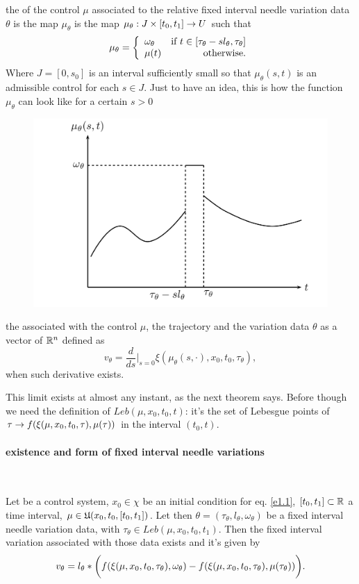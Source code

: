 {	\item the  of the control $\mu$ associated to the relative fixed interval needle variation data $\theta$ is the map $\mu_\theta$ is the map $\mu_\theta:J\times[t_0,t_1]\rightarrow U$ such that
	\[\mu_\theta = \left\{ \begin{array}{lr}
	\omega_\theta & \mbox{if $t\in[\tau_\theta-sl_\theta,\tau_\theta]$}\\
	\mu(t) & \mbox{otherwise}.\end{array}
	\right.	\]
	Where $J=[0,s_0]$ is an interval sufficiently small so that $\mu_\theta(s,t)$ is an admissible control for each $s\in J$.
	Just to have an idea, this is how the function $\mu_\theta$ can look like for a certain $s>0$
	\begin{figure}[H]
		\includegraphics[width=\linewidth]{imgs/needle-variation.png}
		\caption{}
		\label{fig-needle-variation}
	\end{figure}
	\item the  associated with the control $\mu$, the trajectory \trajWinCond{\cdot} and the variation data $\theta$ as a vector of $\mathbb{R}^n$ defined as 
	\[v_\theta = \frac{d}{ds}\bigg|_{s=0} \xi(\mu_\theta(s,\cdot),x_0,t_0,\tau_\theta),\] when such derivative exists.
}
This limit exists at almost any instant, as the next theorem says. Before though we need the definition of $Leb(\mu,x_0,t_0,t)$: it's the set of Lebesgue points of $\tau\rightarrow f(\xi(\mu,x_0,t_0,\tau),\mu(\tau))$ in the interval $(t_0,t)$.

\paragraph[prop 4.9]{existence and form of fixed interval needle variations}\mbox{}\\
\begin{teo}
	 Let \controlSystem\space be a control system, $x_0\in\chi$ be an initial condition for eq. \eqref{e1.1}, $[t_0,t_1]\subset\mathbb{R}$ a time interval, $\mu\in\mathfrak{U}(x_0,t_0,[t_0,t_1])$. Let then $\theta=(\tau_\theta,l_\theta,\omega_\theta)$ be a fixed interval needle variation data, with $\tau_\theta\in Leb(\mu,x_0,t_0,t_1)$. Then the fixed interval variation associated with those data exists and it's given by
\[ v_\theta=l_\theta*\bigg(f(\xi(\mu,x_0,t_0,\tau_\theta),\omega_\theta) - f(\xi(\mu,x_0,t_0,\tau_\theta),\mu(\tau_\theta) )  \bigg). \]
	\label{4-9}
\end{teo}


